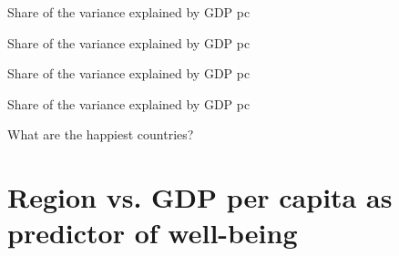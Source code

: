 \documentclass[aspectratio=169,xcolor=dvipsnames, 11pt,mathserif]{beamer}
\begin{document}
\begin{frame}{Share of the variance explained by GDP pc}
    
\end{frame}

\begin{frame}{Share of the variance explained by GDP pc}
    
\end{frame}

\begin{frame}{Share of the variance explained by GDP pc}
    
\end{frame}

\begin{frame}{Share of the variance explained by GDP pc}
    
\end{frame}

\begin{frame}{What are the happiest countries?}
    \bbvs
    \ip 
    \ip 
    \ee
\end{frame}


\section{Region vs. GDP per capita as predictor of well-being}
\end{document}

